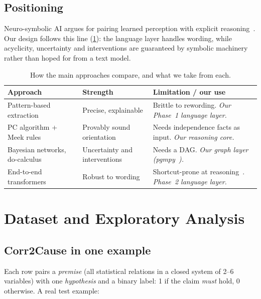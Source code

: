 \documentclass[12pt,a4paper]{article}
\newcommand{\thead}[1]{\textbf{#1}}
\begin{document}
\subsection{Positioning}
Neuro-symbolic AI argues for pairing learned perception with explicit reasoning~\cite{garcez2023}. Our design
follows this line (\cref{tab:lit}): the language layer handles wording, while acyclicity, uncertainty and
interventions are guaranteed by symbolic machinery rather than hoped for from a text model.

\begin{table}[!htbp]
\centering\small
\caption{How the main approaches compare, and what we take from each.}
\label{tab:lit}
\begin{tabularx}{\linewidth}{@{}>{\raggedright}p{3.1cm}>{\raggedright}X>{\raggedright\arraybackslash}X@{}}
\toprule
\thead{Approach} & \thead{Strength} & \thead{Limitation / our use} \\
\midrule
Pattern-based extraction~\cite{khoo2000,girju2003} & Precise, explainable & Brittle to rewording. \emph{Our Phase~1 language layer.} \\
\rowcolor{rowtint} PC algorithm + Meek rules~\cite{spirtes2000,meek1995} & Provably sound orientation & Needs independence facts as input. \emph{Our reasoning core.} \\
Bayesian networks, do-calculus~\cite{pearl1988,pearl2009} & Uncertainty and interventions & Needs a DAG. \emph{Our graph layer (pgmpy~\cite{ankan2015}).} \\
\rowcolor{rowtint} End-to-end transformers~\cite{devlin2019,sanh2019} & Robust to wording & Shortcut-prone at reasoning~\cite{jin2024corr2cause}. \emph{Phase~2 language layer.} \\
\bottomrule
\end{tabularx}
\end{table}

\section{Dataset and Exploratory Analysis}\label{sec:data}

\subsection{Corr2Cause in one example}
Each row pairs a \emph{premise} (all statistical relations in a closed system of 2--6 variables) with one
\emph{hypothesis} and a binary label: 1 if the claim \emph{must} hold, 0 otherwise. A real test example:
\end{document}
